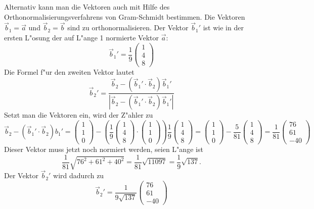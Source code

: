 \begin{loesung}
Alternativ kann man die Vektoren auch mit Hilfe des
Orthonormalisierungsverfahrens von Gram-Schmidt bestimmen.
Die Vektoren $\vec b_1=\vec a$ und $\vec b_2=\vec b$ sind 
zu orthonormalisieren.
Der Vektor $\vec b_1'$ ist wie in der ersten L"osung der auf L"ange 1 normierte
Vektor $\vec a$:
\[
\vec b_1' 
=
\frac19
\begin{pmatrix}
1\\4\\8
\end{pmatrix}
\]
Die Formel f"ur den zweiten Vektor lautet
\[
\vec b_2'=\frac{
\vec b_2-(\vec b_1'\cdot \vec b_2)\vec b_1'
}{
|\vec b_2-(\vec b_1'\cdot \vec b_2)\vec b_1'|
}
\]
Setzt man die Vektoren ein, wird der Z"ahler zu
\[
\vec b_2-(\vec b_1'\cdot \vec b_2)b_1'
=
\begin{pmatrix}
1\\1\\0
\end{pmatrix}
-\left(
\frac19
\begin{pmatrix}
1\\4\\8
\end{pmatrix}
\cdot
\begin{pmatrix}
1\\1\\0
\end{pmatrix}
\right)
\frac19
\begin{pmatrix}
1\\4\\8
\end{pmatrix}
=
\begin{pmatrix}
1\\1\\0
\end{pmatrix}
-
\frac5{81}
\begin{pmatrix}
1\\4\\8
\end{pmatrix}
=
\frac1{81}\begin{pmatrix}
76\\
61\\
-40
\end{pmatrix}
\]
Dieser Vektor muss jetzt noch normiert werden, seien L"ange ist
\[
\frac1{81}\sqrt{76^2+61^2+40^2}
=
\frac1{81}\sqrt{11097}
=
\frac19
\sqrt{137}.
\]
Der Vektor $\vec b_2'$ wird dadurch zu
\[
\vec b_2'
=
\frac1{9\sqrt{137}}\begin{pmatrix}
76\\
61\\
-40
\end{pmatrix}
\]
\end{loesung}
